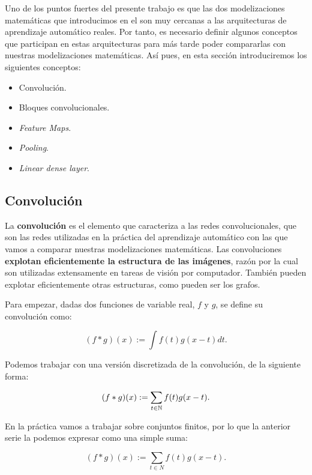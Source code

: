 Uno de los puntos fuertes del presente trabajo es que las dos modelizaciones matemáticas que introducimos en el  son muy cercanas a las arquitecturas de aprendizaje automático reales. Por tanto, es necesario definir algunos conceptos que participan en estas arquitecturas para más tarde poder compararlas con nuestras modelizaciones matemáticas. Así pues, en esta sección introduciremos los siguientes conceptos:

\begin{itemize}
    \item Convolución.
    \item Bloques convolucionales.
    \item \textit{Feature Maps}.
    \item \textit{Pooling}.
    \item \textit{Linear dense layer}.
\end{itemize}

\subsection{Convolución}

La \textbf{convolución} es el elemento que caracteriza a las redes convolucionales, que son las redes utilizadas en la práctica del aprendizaje automático con las que vamos a comparar nuestras modelizaciones matemáticas. Las convoluciones \textbf{explotan eficientemente la estructura de las imágenes}, razón por la cual son utilizadas extensamente en tareas de visión por computador. También pueden explotar eficientemente otras estructuras, como pueden ser los grafos.

Para empezar, dadas dos funciones de variable real, $f$ y $g$, se define su convolución como:

\begin{equation}
    (f * g)(x) := \int f(t) g(x - t) dt.
\end{equation}

Podemos trabajar con una versión discretizada de la convolución, de la siguiente forma:

\begin{equation}
    (f * g)(x) := \sum_{t \in \mathbb{N}} f(t) g(x - t).
\end{equation}

En la práctica vamos a trabajar sobre conjuntos finitos, por lo que la anterior serie la podemos expresar como una simple suma:

\begin{equation}
    (f * g)(x) := \sum_{t \in N} f(t) g(x - t).
\end{equation}


